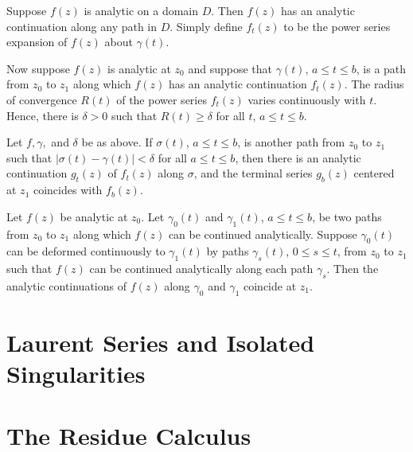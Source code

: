 \documentclass[12pt, a4paper, oneside, openright, titlepage]{book}
\begin{document}
\begin{eg}
    Suppose $f(z)$ is analytic on a domain $D$. Then $f(z)$ has an analytic continuation along any path in $D$. Simply define $f_t(z)$ to be the power series expansion of $f(z)$ about $\gamma(t)$.
\end{eg}

Now suppose $f(z)$ is analytic at $z_0$ and suppose that $\gamma(t)$, $a \leq t \leq b$, is a path from $z_0$ to $z_1$ along which $f(z)$ has an analytic continuation $f_t(z)$. The radius of convergence $R(t)$ of the power series $f_t(z)$ varies continuously with $t$. Hence, there is $\delta > 0$ such that $R(t) \geq \delta$ for all $t$, $a \leq t \leq b$.

\begin{lem}
    Let $f,\gamma,$ and $\delta$ be as above. If $\sigma(t)$, $a \leq t \leq b$, is another path from $z_0$ to $z_1$ such that $|\sigma(t) - \gamma(t)| < \delta$ for all $a \leq t \leq b$, then there is an analytic continuation $g_t(z)$ of $f_t(z)$ along $\sigma$, and the terminal series $g_b(z)$ centered at $z_1$ coincides with $f_b(z)$.
\end{lem}


\begin{namthm}
    Let $f(z)$ be analytic at $z_0$. Let $\gamma_0(t)$ and $\gamma_1(t)$, $a \leq t \leq b$, be two paths from $z_0$ to $z_1$ along which $f(z)$ can be continued analytically. Suppose $\gamma_0(t)$ can be deformed continuously to $\gamma_1(t)$ by paths $\gamma_s(t)$, $0\leq s \leq t$, from $z_0$ to $z_1$ such that $f(z)$ can be continued analytically along each path $\gamma_s$. Then the analytic continuations of $f(z)$ along $\gamma_0$ and $\gamma_1$ coincide at $z_1$.
\end{namthm}






\chapter{Laurent Series and Isolated Singularities}






\chapter{The Residue Calculus}
\end{document}
